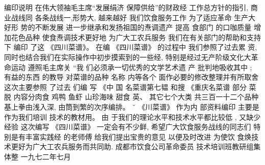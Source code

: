 编印说明
在伟大领袖毛主席“发展绢济 保障供给”的财政经 工作总方针的指引, 商业战线同 各条战线一,形势大, 越来越好 我们饮食服务工作 为了适应革命 生产大好形 势的不断发展 进一步继承和发扬祖国的焘调遗产 提高 食部门 的口咖质量 增加花色品种 使食焘调技术更好地 为广大工农兵服务 我们在有关部门的帮助和支持下 编印 了这 《四川菜谱》。 
在编 《四川菜谱》 的过程中 我们参照了过去累 资,同时也结合我们在实际操作中初步摸索到的一些经, 特别是经过无产阶级文化大革命运动 遵照毛主席关 “我 们必须承一切优秀的文学艺术遗 产 批判地吸收其中 ; 有益的东西 的教导 对菜谱的品种 名称 内等各个 面作必要的修改整理并有所取舍 这次主要参照 了过去 们编 写 《中 国 名菜谱第七韫 和搜 《重庆名菜谱 部分 菜脱 内容分肉食 鸡鸭 鱼虾 山珍海味 甜食 英、 其它七个大类 共三百一十二个品种 基上拳由浅入深, 由筒到繁的次序编排。 ˇ 
《川菜谱》 作为内 部资料编印 主要是作为我们培训 技术的教材用。 由 于我们的理论水平和技术水平都比较低 , 又缺少经验 这次编写 《四川菜谱》 一定会有不少鲜, 希望广大饮食服务战线的同志们 特别是有丰富实践经 的老师傅 给我们提出宝贵的意见 以便及时改进 为使饮 食焕技术更好为广大工农兵服务而共同助. 
成都市饮食公司革命委员
技术培训班教研组集体整
一九七二年七月
